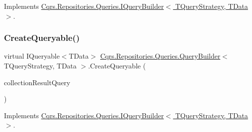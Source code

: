 Implements \hyperlink{interfaceCqrs_1_1Repositories_1_1Queries_1_1IQueryBuilder_a83cb87d485491c6d38fe8fa6fd649373}{Cqrs.\+Repositories.\+Queries.\+I\+Query\+Builder$<$ T\+Query\+Strategy, T\+Data $>$}.

\mbox{\label{classCqrs_1_1Repositories_1_1Queries_1_1QueryBuilder_af8860edf3677cb80ae481f17ff2db9b5}} 
\subsubsection{\texorpdfstring{Create\+Queryable()}{CreateQueryable()}\hspace{0.1cm}{\footnotesize\ttfamily [2/2]}}
{\footnotesize\ttfamily virtual I\+Queryable$<$T\+Data$>$ \hyperlink{classCqrs_1_1Repositories_1_1Queries_1_1QueryBuilder}{Cqrs.\+Repositories.\+Queries.\+Query\+Builder}$<$ T\+Query\+Strategy, T\+Data $>$.Create\+Queryable (\begin{DoxyParamCaption}\item[{\hyperlink{interfaceCqrs_1_1Repositories_1_1Queries_1_1ICollectionResultQuery}{I\+Collection\+Result\+Query}$<$ T\+Query\+Strategy, T\+Data $>$}]{collection\+Result\+Query }\end{DoxyParamCaption})\hspace{0.3cm}{\ttfamily [virtual]}}



Implements \hyperlink{interfaceCqrs_1_1Repositories_1_1Queries_1_1IQueryBuilder_ab903955b6fb1843a3e168b33252161a5}{Cqrs.\+Repositories.\+Queries.\+I\+Query\+Builder$<$ T\+Query\+Strategy, T\+Data $>$}.

\mbox{\label{classCqrs_1_1Repositories_1_1Queries_1_1QueryBuilder_a553ad69e77d37f28b40e6c9d8e98b716}} 
